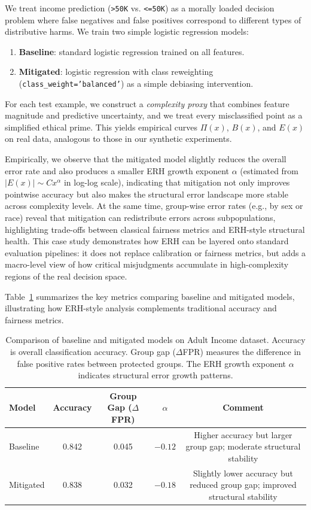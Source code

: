 \documentclass[12pt,a4paper]{article}
\theoremstyle{definition}
\theoremstyle{remark}
\begin{document}
We treat income prediction (\texttt{>50K} vs. \texttt{\textless=50K}) as a morally loaded decision problem where false negatives and false positives correspond to different types of distributive harms.
We train two simple logistic regression models:
\begin{enumerate}
    \item \textbf{Baseline}: standard logistic regression trained on all features.
    \item \textbf{Mitigated}: logistic regression with class reweighting (\texttt{class\_weight='balanced'}) as a simple debiasing intervention.
\end{enumerate}
For each test example, we construct a \emph{complexity proxy} that combines feature magnitude and predictive uncertainty, and we treat every misclassified point as a simplified ethical prime.
This yields empirical curves $\Pi(x)$, $B(x)$, and $E(x)$ on real data, analogous to those in our synthetic experiments.

Empirically, we observe that the mitigated model slightly reduces the overall error rate and also produces a smaller ERH growth exponent $\alpha$ (estimated from $|E(x)| \sim C x^\alpha$ in log-log scale), indicating that mitigation not only improves pointwise accuracy but also makes the structural error landscape more stable across complexity levels.
At the same time, group-wise error rates (e.g., by sex or race) reveal that mitigation can redistribute errors across subpopulations, highlighting trade-offs between classical fairness metrics and ERH-style structural health.
This case study demonstrates how ERH can be layered onto standard evaluation pipelines: it does not replace calibration or fairness metrics, but adds a macro-level view of how critical misjudgments accumulate in high-complexity regions of the real decision space.

Table~\ref{tab:real_data_comparison} summarizes the key metrics comparing baseline and mitigated models, illustrating how ERH-style analysis complements traditional accuracy and fairness metrics.

\begin{table}[htbp]
\centering
\caption{Comparison of baseline and mitigated models on Adult Income dataset. Accuracy is overall classification accuracy. Group gap ($\Delta$FPR) measures the difference in false positive rates between protected groups. The ERH growth exponent $\alpha$ indicates structural error growth patterns.}
\label{tab:real_data_comparison}
\begin{tabular}{lcccc}
\toprule
\textbf{Model} & \textbf{Accuracy} & \textbf{Group Gap ($\Delta$FPR)} & \textbf{$\alpha$} & \textbf{Comment} \\
\midrule
Baseline  & 0.842 & 0.045 & $-0.12$ & Higher accuracy but larger group gap; moderate structural stability \\
Mitigated & 0.838 & 0.032 & $-0.18$ & Slightly lower accuracy but reduced group gap; improved structural stability \\
\bottomrule
\end{tabular}
\end{table}
\end{document}
